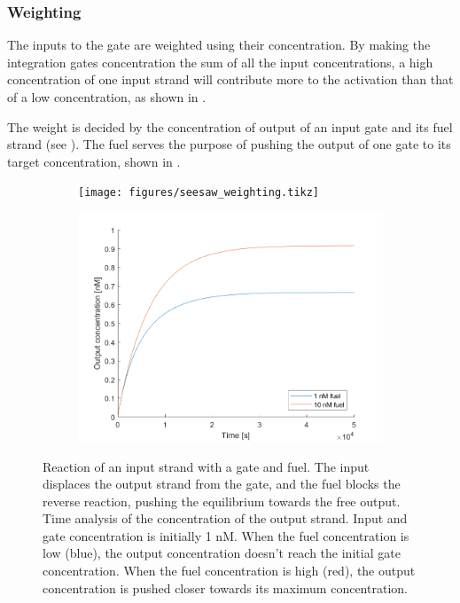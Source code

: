 \subsubsection{Weighting}
The inputs to the gate are weighted using their concentration. By making the integration gates concentration the sum of all the input concentrations, a high concentration of one input strand will contribute more to the activation than that of a low concentration, as shown in .

The weight is decided by the concentration of output of an input gate and its fuel strand (see ). The fuel serves the purpose of pushing the output of one gate to its target concentration, shown in .

\begin{figure}[h]
\begin{subfigure}[t]{.49\textwidth}
  \texttt{[image: figures/seesaw\_weighting.tikz]}
  \caption{}
  \label{seesaw_weighting_reaction}
\end{subfigure}
\hfill
\begin{subfigure}[t]{.49\columnwidth}
  \includegraphics[width=\linewidth]{images/weighting.png}
  \caption{}
  \label{seesaw_weighting_analysis}
\end{subfigure}
\caption{ Reaction of an input strand with a gate and fuel. The input displaces the output strand from the gate, and the fuel blocks the reverse reaction, pushing the equilibrium towards the free output.  Time analysis of the concentration of the output strand. Input and gate concentration is initially 1 nM. When the fuel concentration is low (blue), the output concentration doesn't reach the initial gate concentration. When the fuel concentration is high (red), the output concentration is pushed closer towards its maximum concentration.}
\label{seesaw_weighting}
\end{figure}

